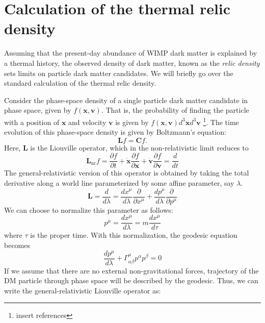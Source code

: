 \section{Calculation of the thermal relic density}

Assuming that the present-day abundance of WIMP dark matter is explained by a thermal history, the observed density of dark matter, known as the \emph{relic density} sets limits on particle dark matter candidates. We will briefly go over the standard calculation of the thermal relic density.

\newcommand{\fxv}{f(\mathbf{x},\mathbf{v})}

Consider the phase-space density of a single particle dark matter candidate in phase space, given by $\fxv$. That is, the probability of finding the particle with a position of $\mathbf{x}$ and velocity $\mathbf{v}$ is given by $\fxv d^3\mathbf{x}d^3\mathbf{v}$ \footnote{insert references}.
The time evolution of this phase-space density is given by Boltzmann's equation:
\begin{equation}
  \mathbf{L}f = \mathbf{C}f.
\end{equation}
Here, $\mathbf{L}$ is the Liouville operator, which in the non-relativistic limit reduces to 
\begin{equation}
  \mathbf{L}_\text{nr}f = \frac{\partial f}{\partial t} + \mathbf{\dot{x}}\frac{\partial f}{\partial\mathbf{x}} + \mathbf{\dot{v}}\frac{\partial f}{\partial \mathbf{v}} = \frac{d}{dt}
\end{equation}
The general-relativistic version of this operator is obtained by taking the total derivative along a world line parameterized by some affine parameter, say  $\lambda$.
\begin{equation}
  \mathbf{L} = \frac{d}{d\lambda} = \frac{dx^\mu}{d\lambda}\frac{\partial}{\partial x^\mu} + \frac{dp^\mu}{d\lambda}\frac{\partial}{\partial p^\mu}
\end{equation}
We can choose to normalize this parameter as follows:
\begin{equation}
  p^\mu = \frac{dx^\mu}{d\lambda} = m\frac{dx^\mu}{d\tau}
\end{equation}
where $\tau$ is the proper time. With this normalization, the geodesic equation becomes
\begin{equation}
  \frac{dp^\mu}{d\lambda}+\Gamma^{\mu}_{\alpha\beta}p^\alpha p^\beta = 0
\end{equation}
If we assume that there are no external non-gravitational forces, trajectory of the DM particle through phase space will be described by the geodesic. Thus, we can write the general-relativistic Liouville operator as:
